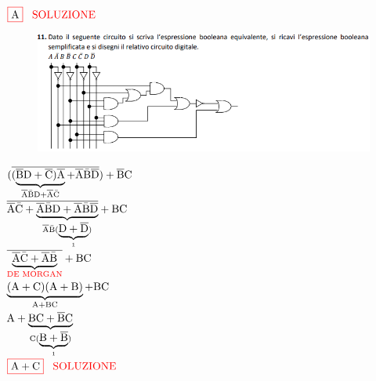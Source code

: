 $ \color{red}\boxed{\normalcolor\A} \hspace{0.3cm}\SOLUZIONE$ \\


\enlargethispage{18pt}
\begin{figure}[ht]
	\includegraphics[width=1\linewidth]{es11_esBoole}
	\label{fig:es11esBoole}
\end{figure}

$ (\overline{(\underbrace{\overline{\text{B}}\text{D} + \overline{\text{C}})\overline{\text{A}}} _{\overline{\text{A}}\bar{\text{B}}\text{D} + \overline{\text{A}}\bar{\text{C}}} 
	+ \overline{\text{A}}\bar{\text{B}}\overline{\text{D}}}) + \overline{\text{B}}\text{C}$ \\

$ \overline{\overline{\text{A}}\bar{\text{C}} + \underbrace{\overline{\text{A}}\bar{\text{B}}\text{D} + \overline{\text{A}}\bar{\text{B}}\overline{\text{D}}} _{\overline{\text{A}}\bar{\text{B}}(\underbrace{\text{D} + \overline{\text{D}}} _{1})}} + \text{B}\text{C} $ \\

$ \overline{\underbrace{\overline{\text{A}}\bar{\text{C}} + \overline{\text{A}}\bar{\text{B}}} _{\textrm{\color{red} DE MORGAN}}} + \text{B}\text{C} $ \\

$ \underbrace{(\text{A} + \text{C})(\text{A} + \text{B})} _{\text{A} + \text{B}\text{C}} + \text{B}\text{C} $ \\

$ \text{A} + \underbrace{\text{B}\text{C} + \overline{\text{B}}\text{C}} _{\text{C}(\underbrace{\text{B} + \overline{\text{B}}} _{1})} $ \\

$ \color{red}\boxed{\normalcolor \A + \C} \hspace{0.3cm}\SOLUZIONE $ \\

